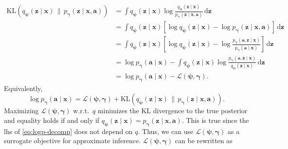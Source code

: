 \begin{align*}
    \mathrm{KL}\!\left(q_{\boldsymbol{\psi}}(\mathbf{z}\mid \mathbf{x})\,\|\,p_{\boldsymbol{\gamma}}(\mathbf{z}\mid \mathbf{x},\mathbf{a})\right)
    &= \int q_{\boldsymbol{\psi}}(\mathbf{z}\mid \mathbf{x}) \log\frac{q_{\boldsymbol{\psi}}(\mathbf{z}\mid \mathbf{x})}{p_{\boldsymbol{\gamma}}(\mathbf{z}\mid \mathbf{x},\mathbf{a})}\, \mathrm{d}\mathbf{z} \\
    &= \int q_{\boldsymbol{\psi}}(\mathbf{z}\mid \mathbf{x}) \left[ \log q_{\boldsymbol{\psi}}(\mathbf{z}\mid \mathbf{x}) - \log p_{\boldsymbol{\gamma}}(\mathbf{z}\mid \mathbf{x},\mathbf{a}) \right] \, \mathrm{d}\mathbf{z} \\
    &= \int q_{\boldsymbol{\psi}}(\mathbf{z}\mid \mathbf{x}) \left[ \log q_{\boldsymbol{\psi}}(\mathbf{z}\mid \mathbf{x}) - \log\frac{p_{\boldsymbol{\gamma}}(\mathbf{a},\mathbf{z}\mid \mathbf{x})}{p_{\boldsymbol{\gamma}}(\mathbf{a}\mid \mathbf{x})} \right] \, \mathrm{d}\mathbf{z} \\
    &= \log p_{\boldsymbol{\gamma}}(\mathbf{a}\mid \mathbf{x}) - \int q_{\boldsymbol{\psi}}(\mathbf{z}\mid \mathbf{x}) \log\frac{p_{\boldsymbol{\gamma}}(\mathbf{a},\mathbf{z}\mid \mathbf{x})}{q_{\boldsymbol{\psi}}(\mathbf{z}\mid \mathbf{x})}\, \mathrm{d}\mathbf{z} \\
    &= \log p_{\boldsymbol{\gamma}}(\mathbf{a}\mid \mathbf{x}) - \mathcal{L}(\boldsymbol{\psi},\boldsymbol{\gamma}).
\end{align*}
Equivalently,
\begin{equation}
\log p_{\boldsymbol{\gamma}}(\mathbf{a}\mid \mathbf{x})
=
\mathcal{L}(\boldsymbol{\psi},\boldsymbol{\gamma})
+
\mathrm{KL}\!\left(q_{\boldsymbol{\psi}}(\mathbf{z}\mid \mathbf{x})\,\|\,p_{\boldsymbol{\gamma}}(\mathbf{z}\mid \mathbf{x},\mathbf{a})\right).
\label{eq:logp-decomp}
\end{equation}
Maximizing \(\mathcal{L}(\boldsymbol{\psi},\boldsymbol{\gamma})\) w.r.t.\ \(q\) minimizes the 
KL divergence to the true posterior and equality 
holds if and only if \(q_{\boldsymbol{\psi}}(\mathbf{z}\mid \mathbf{x}) = 
p_{\boldsymbol{\gamma}}(\mathbf{z}\mid \mathbf{x},\mathbf{a})\). 
This is true since the lhs of \eqref{eq:logp-decomp} does not depend on \(q\). 
Thus, we can use \(\mathcal{L}(\boldsymbol{\psi},\boldsymbol{\gamma})\) as a surrogate objective for approximate inference. 
\(\mathcal{L}(\boldsymbol{\psi},\boldsymbol{\gamma})\) can be rewritten as 
